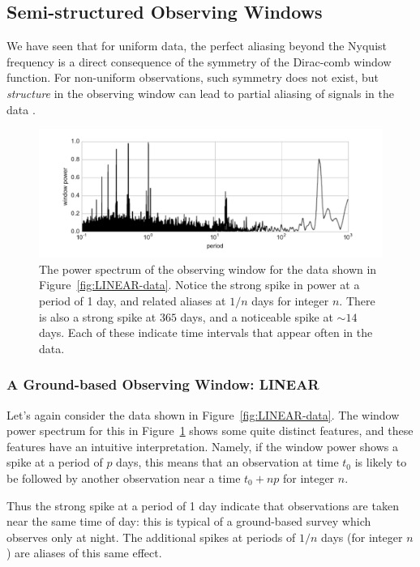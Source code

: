 \documentclass[preprint]{aastex}
\newcommand{\fig}[1]{Figure~\ref{fig:#1}}
\newcommand{\figlabel}[1]{\label{fig:#1}}
\begin{document}
\subsection{Semi-structured Observing Windows}

We have seen that for uniform data, the perfect aliasing beyond the Nyquist
frequency is a direct consequence of the symmetry of the Dirac-comb window
function.
For non-uniform observations, such symmetry does not exist, but {\it structure}
in the observing window can lead to partial aliasing of signals in the
data \citep[see, e.g.][]{Deeming75}.


\begin{figure}[ht]
  \centering
  \includegraphics[width=\textwidth]{fig14_LINEAR_window}
  \caption{The power spectrum of the observing window for the data shown
    in \fig{LINEAR-data}. Notice the strong spike in power at a period of
    1 day, and related aliases at $1/n$ days for integer $n$.
    There is also a strong spike at $365$ days, and a noticeable spike at
    $\sim 14$ days. Each of these indicate time intervals that appear often
    in the data.
    \figlabel{LINEAR-window}}
\end{figure}

\subsubsection{A Ground-based Observing Window: LINEAR}

Let's again consider the data shown in \fig{LINEAR-data}. The window power
spectrum for this in \fig{LINEAR-window} shows some quite distinct features,
and these features have an intuitive interpretation.
Namely, if the window power shows a spike at a period of $p$ days, this means
that an observation at time $t_0$ is likely to be followed by another
observation near a time $t_0 + np$ for integer $n$.

Thus the strong spike at a period of 1 day indicate that observations are
taken near the same time of day: this is typical of a ground-based survey
which observes only at night.
The additional spikes at periods of $1/n$ days (for integer $n$) are aliases
of this same effect.
\end{document}
